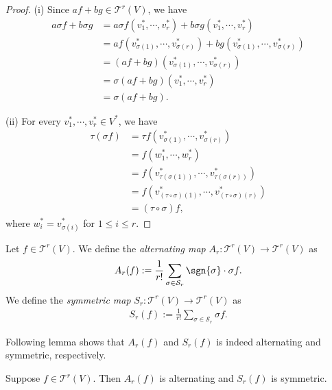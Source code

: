 \begin{proof}
    (i) Since $af + bg \in \mathcal{T}^r(V)$, we have
    \begin{align*}
        a\sigma f + b\sigma g
        &= a\sigma f(v_1^*, \cdots, v_r^*) + b\sigma g(v_1^*, \cdots, v_r^*)\\
        &= af(v_{\sigma(1)}^*, \cdots, v_{\sigma(r)}^*) + bg(v_{\sigma(1)}^*, \cdots, v_{\sigma(r)}^*)\\
        &= (af + bg)(v_{\sigma(1)}^*, \cdots, v_{\sigma(r)}^*)\\
        &= \sigma(af + bg)(v_1^*, \cdots, v_r^*)\\
        &= \sigma(af + bg).
    \end{align*}

    (ii) For every $v_1^*, \cdots, v_r^* \in V^*$, we have
    \begin{align*}
        \tau(\sigma f)
        &= \tau f(v_{\sigma(1)}^*, \cdots, v_{\sigma(r)}^*)\\
        &= f(w_1^*, \cdots, w_r^*)\\
        &= f(v_{\tau(\sigma(1))}^*, \cdots, v_{\tau(\sigma(r))}^*)\\
        &= f(v_{(\tau \circ \sigma)(1)}^*, \cdots, v_{(\tau \circ \sigma)(r)}^*)\\
        &= (\tau \circ \sigma)f,
    \end{align*}
    where $w_i^* = v_{\sigma(i)}^*$ for $1 \leq i \leq r$.
\end{proof}

\begin{definition}
    Let $f \in \mathcal{T}^r(V)$. We define the \emph{alternating map} $A_r : \mathcal{T}^r(V) \to \mathcal{T}^r(V)$ as
    \begin{align*}
        A_r(f) := \frac{1}{r!}\sum_{\sigma \in \mathcal{S}_r}\sgn{\sigma} \cdot \sigma f.
    \end{align*}
    We define the \emph{symmetric map} $S_r : \mathcal{T}^r(V) \to \mathcal{T}^r(V)$ as
    \begin{align*}
        S_r(f) := \frac{1}{r!}\sum_{\sigma \in \mathcal{S}_r}\sigma f.
    \end{align*}
\end{definition}

Following lemma shows that $A_r(f)$ and $S_r(f)$ is indeed alternating and symmetric, respectively.

\begin{lemma}
    Suppose $f \in \mathcal{T}^r(V)$. Then $A_r(f)$ is alternating and $S_r(f)$ is symmetric.
\end{lemma}

